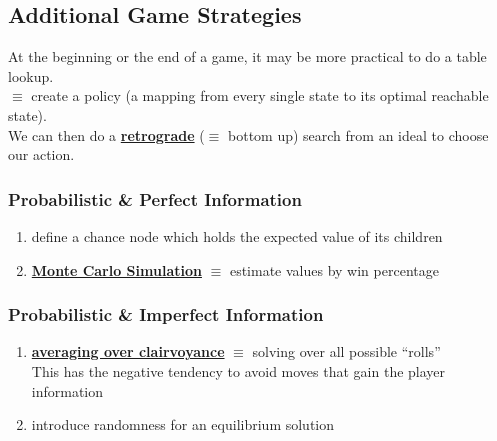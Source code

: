 \documentclass[../../lecture_notes.tex]{subfiles}
\begin{document}
\subsection*{Additional Game Strategies}
\noindent At the beginning or the end of a game, it may be more practical to do a table lookup.\\
\indent $\equiv$ create a policy (a mapping from every single state to its optimal reachable state).\\
\indent We can then do a \textbf{\underline{retrograde}} 
	($\equiv$ bottom up) search from an ideal to choose our action.\\

\subsubsection*{Probabilistic \& Perfect Information}
\begin{enumerate} [itemsep=0mm]
	\item define a chance node which holds the expected value of its children
	\item \textbf{\underline{Monte Carlo Simulation}} $\equiv$ estimate values by win percentage
\end{enumerate}

\subsubsection*{Probabilistic \& Imperfect Information}
\begin{enumerate} [itemsep=0mm]
	\item \textbf{\underline{averaging over clairvoyance}} $\equiv$ solving over all possible “rolls”\\
	            This has the negative tendency to avoid moves that gain the player information
	\item introduce randomness for an equilibrium solution
\end{enumerate}
\end{document}
